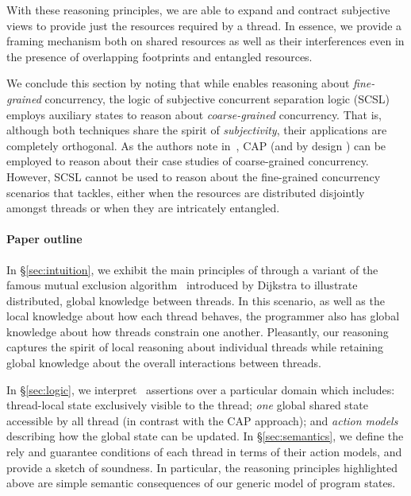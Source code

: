 With these reasoning principles, we are able to expand and contract subjective views to provide just the resources required by a thread. In essence, we provide a framing mechanism both on shared resources as well as their interferences even in the presence of overlapping footprints and entangled resources.

We conclude this section by noting that while \colosl enables reasoning about \emph{fine-grained} concurrency, the logic of subjective concurrent separation logic (SCSL)~\cite{SCSL} employs auxiliary states to reason about \emph{coarse-grained} concurrency. That is, although both techniques share the spirit of \emph{subjectivity}, their applications are completely orthogonal. As the authors note in~\cite{SCSL}, CAP (and by design \colosl) can be employed to reason about their case studies of coarse-grained concurrency. However, SCSL cannot be used to reason about the fine-grained concurrency scenarios that \colosl tackles, either when the resources are distributed disjointly amongst threads or when they are intricately entangled.\vspace{-10pt}
%
\paragraph{\textbf{Paper outline}}
In \S\ref{sec:intuition}, we exhibit the main principles of \colosl through a variant of the famous mutual exclusion algorithm~\cite{dijkstra74} introduced by Dijkstra to illustrate distributed, global knowledge between threads. In this scenario, as well as the local knowledge about how each thread behaves, the programmer also has global knowledge about how threads constrain one another. Pleasantly, our reasoning captures the spirit of local reasoning about individual threads while retaining global knowledge about the overall interactions between threads. 

\todo In \S\ref{sec:logic}, we interpret \colosl\ assertions over a particular domain which includes: thread-local state exclusively visible to the thread; {\em one} global shared state accessible by all thread (in contrast with the CAP approach); and {\em action models} describing how the global state can be updated. In \S\ref{sec:semantics}, we define the rely and guarantee conditions of each thread in terms of their action models, and provide a sketch of soundness. In particular, the reasoning principles highlighted above are simple semantic
consequences of our generic model of program states.  


